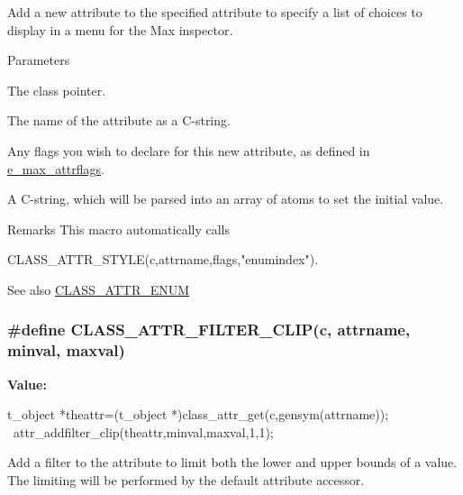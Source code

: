Add a new attribute to the specified attribute to specify a list of choices to display in a menu for the Max inspector. 
\begin{DoxyParams}{Parameters}
\item[{\em c}]The class pointer. \item[{\em attrname}]The name of the attribute as a C-\/string. \item[{\em flags}]Any flags you wish to declare for this new attribute, as defined in \hyperlink{group__attr_gaf296cfc6741bb19207f6ed8062809115}{e\_\-max\_\-attrflags}. \item[{\em parsestr}]A C-\/string, which will be parsed into an array of atoms to set the initial value.\end{DoxyParams}
\begin{DoxyRemark}{Remarks}
This macro automatically calls 
\begin{DoxyCode}
    CLASS_ATTR_STYLE(c,attrname,flags,"enumindex").
\end{DoxyCode}

\end{DoxyRemark}
\begin{DoxySeeAlso}{See also}
\hyperlink{group__attr_gaababb47839dc4396bddfbf8149214e21}{CLASS\_\-ATTR\_\-ENUM} 
\end{DoxySeeAlso}
\hypertarget{group__attr_ga7a9fa82b3419df8a770830fb34df39b0}{
\subsubsection[{CLASS\_\-ATTR\_\-FILTER\_\-CLIP}]{\setlength{\rightskip}{0pt plus 5cm}\#define CLASS\_\-ATTR\_\-FILTER\_\-CLIP(c, \/  attrname, \/  minval, \/  maxval)}}
\label{group__attr_ga7a9fa82b3419df8a770830fb34df39b0}
{\bfseries Value:}
\begin{DoxyCode}
{ t_object *theattr=(t_object *)class_attr_get(c,gensym(attrname)); \
        attr_addfilter_clip(theattr,minval,maxval,1,1); }
\end{DoxyCode}


Add a filter to the attribute to limit both the lower and upper bounds of a value. The limiting will be performed by the default attribute accessor.


